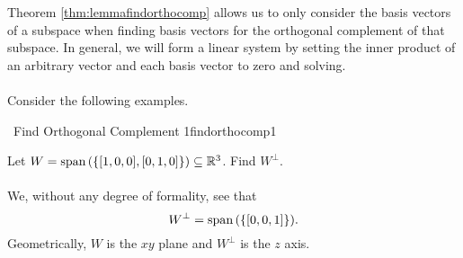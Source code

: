         Theorem \ref{thm:lemmafindorthocomp} allows us to only consider the basis vectors of a subspace when finding basis vectors for the orthogonal complement of that subspace. In general, we will form a linear system by setting the inner product of an arbitrary vector and each basis vector to zero and solving.
        \pagebreak
        \\
        \\
        Consider the following examples.
        \begin{example}{\Difficulty\,\Difficulty\,\,Find Orthogonal Complement 1}{findorthocomp1}

            Let \(W=\text{span\,}(\{[1,0,0],[0,1,0]\})\subseteq\mathbb{R}^3\). Find \(W^\perp\).
            \\
            \\
            We, without any degree of formality, see that 
            \begin{equation*}
                W^\perp=\text{span\,}(\{[0,0,1]\}).
            \end{equation*}
            Geometrically, \(W\) is the \(xy\) plane and \(W^\perp\) is the \(z\) axis.
            
        \end{example}
